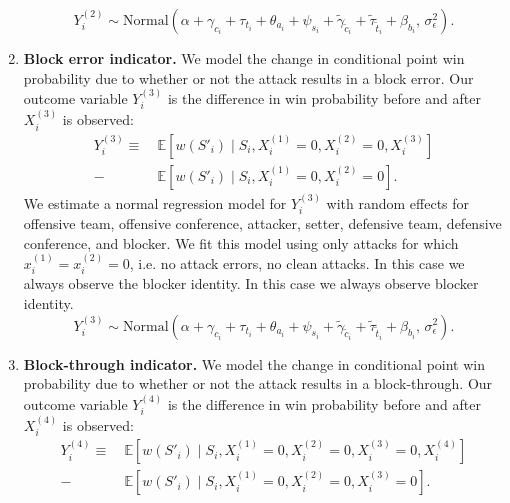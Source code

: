 \documentclass{article}
\begin{document}
\begin{enumerate}
        \begin{equation}
        \label{eqn:attack-model-2}
            Y_i^{(2)} \sim \mbox{Normal}\left(
                \alpha + \gamma_{c_i} + \tau_{t_i} + \theta_{a_i} + \psi_{s_i} + \tilde\gamma_{\tilde c_i} + \tilde\tau_{\tilde t_i} + \beta_{b_i},\,
                \sigma^2_\epsilon
            \right).
        \end{equation}
    \item
        {\bf Block error indicator.} We model the change in conditional point win probability due to whether or not the attack results in a block error. Our outcome variable $Y_i^{(3)}$ is the difference in win probability before and after $X_i^{(3)}$ is observed:
        \begin{align*}
            Y_i^{(3)} \equiv &~\mathbb{E}\left[w(S'_i) \mid S_i, X_i^{(1)} = 0, X_i^{(2)} = 0, X_i^{(3)}\right]\\
            - &~\mathbb{E}\left[w(S'_i) \mid S_i, X_i^{(1)} = 0, X_i^{(2)} = 0\right].
        \end{align*}
        We estimate a normal regression model for $Y_i^{(3)}$ with random effects for offensive team, offensive conference, attacker, setter, defensive team, defensive conference, and blocker. We fit this model using only attacks for which $x_i^{(1)} = x_i^{(2)} = 0$, i.e. no attack errors, no clean attacks. In this case we always observe the blocker identity. In this case we always observe blocker identity.
        \begin{equation}
        \label{eqn:attack-model-3}
            Y_i^{(3)} \sim \mbox{Normal}\left(
                \alpha + \gamma_{c_i} + \tau_{t_i} + \theta_{a_i} + \psi_{s_i} + \tilde\gamma_{\tilde c_i} + \tilde\tau_{\tilde t_i} + \beta_{b_i},\,
                \sigma^2_\epsilon
            \right).
        \end{equation}
    \item
        {\bf Block-through indicator.} We model the change in conditional point win probability due to whether or not the attack results in a block-through. Our outcome variable $Y_i^{(4)}$ is the difference in win probability before and after $X_i^{(4)}$ is observed:
        \begin{align*}
            Y_i^{(4)} \equiv &~\mathbb{E}\left[w(S'_i) \mid S_i, X_i^{(1)} = 0, X_i^{(2)} = 0, X_i^{(3)} = 0, X_i^{(4)}\right]\\
            - &~\mathbb{E}\left[w(S'_i) \mid S_i, X_i^{(1)} = 0, X_i^{(2)} = 0, X_i^{(3)} = 0\right].
        \end{align*}

\end{enumerate}
\end{document}

